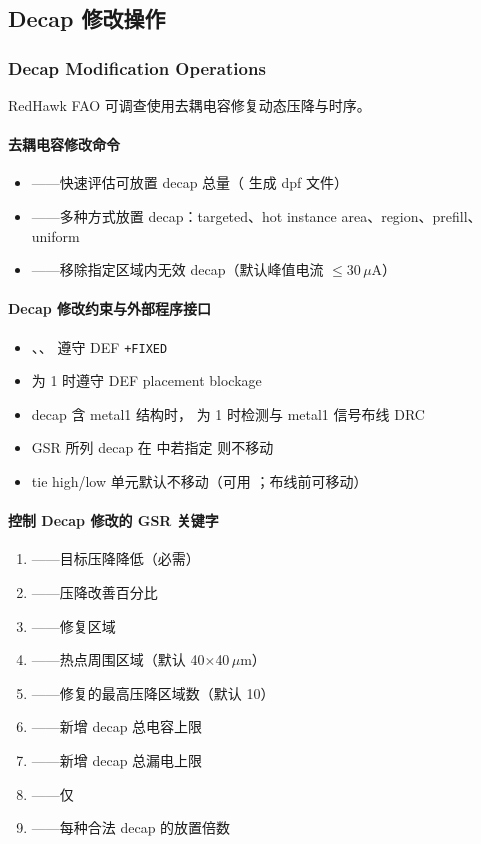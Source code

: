 \subsection{Decap 修改操作}
\subsubsection*{Decap Modification Operations}

RedHawk FAO 可调查使用去耦电容修复动态压降与时序。

\paragraph{去耦电容修改命令}
\begin{itemize}
  \item {}——快速评估可放置 decap 总量（ 生成 dpf 文件）
  \item {}——多种方式放置 decap：targeted、hot instance area、region、prefill、uniform
  \item {}——移除指定区域内无效 decap（默认峰值电流 $\leq$30\,$\mu$A）
\end{itemize}

\paragraph{Decap 修改约束与外部程序接口}
\begin{itemize}
  \item {}、、 遵守 DEF \texttt{+FIXED}
  \item {} 为 1 时遵守 DEF placement blockage
  \item decap 含 metal1 结构时， 为 1 时检测与 metal1 信号布线 DRC
  \item GSR 所列 decap 在  中若指定  则不移动
  \item tie high/low 单元默认不移动（可用 ；布线前可移动）
\end{itemize}

\paragraph{控制 Decap 修改的 GSR 关键字}
\begin{enumerate}
  \item {}——目标压降降低（必需）
  \item {}——压降改善百分比
  \item {}——修复区域
  \item {}——热点周围区域（默认 40$\times$40\,$\mu$m）
  \item {}——修复的最高压降区域数（默认 10）
  \item {}——新增 decap 总电容上限
  \item {}——新增 decap 总漏电上限
  \item {}——仅 
  \item {}——每种合法 decap 的放置倍数
\end{enumerate}

